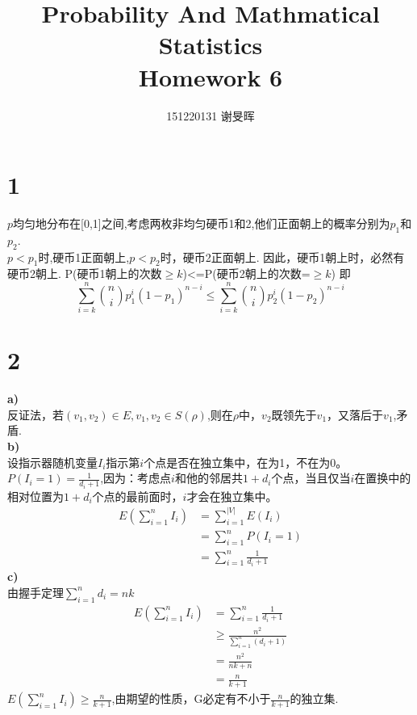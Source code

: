 \documentclass[a4paper,twocolumn]{ctexart}
\title{Probability And Mathmatical Statistics\\Homework 6}
\author{151220131 谢旻晖}
\date{}
\begin{document}
\maketitle
\section*{1}
$p$均匀地分布在[0,1]之间,考虑两枚非均匀硬币1和2,他们正面朝上的概率分别为$p_1$和$p_2$.\\
$p<p_1$时,硬币1正面朝上,$p<p_2$时，硬币2正面朝上.
因此，硬币1朝上时，必然有硬币2朝上.
P(硬币1朝上的次数$\ge k$)<=P(硬币2朝上的次数=$\ge k$)
即
\[
\sum_{i=k}^n\binom{n}{i}p_1^{i}(1-p_1)^{n-i}\le\sum_{i=k}^n\binom{n}{i}p_2^{i}(1-p_2)^{n-i}
\]
\section*{2}
\noindent \textbf{a)}\\
反证法，若$(v_1,v_2)\in E,v_1,v_2\in S(\rho)$,则在$\rho$中，$v_2$既领先于$v_1$，又落后于$v_1$,矛盾.\\
\noindent \textbf{b)}\\
设指示器随机变量$I_i$指示第$i$个点是否在独立集中，在为1，不在为0。$P(I_i=1)=\frac{1}{d_i+1}$,因为：考虑点$i$和他的邻居共$1+d_i$个点，当且仅当$i$在置换中的相对位置为$1+d_i$个点的最前面时，$i$才会在独立集中。
\begin{align*}
E(\sum_{i=1}^{n}I_i)&=\sum_{i=1}^{|V|}E(I_i)\\
&=\sum_{i=1}^{n}P(I_i=1)\\
&=\sum_{i=1}^{n}\frac{1}{d_i+1}
\end{align*}
\noindent \textbf{c)}\\
由握手定理$\sum_{i=1}^{n}d_i=nk$
\begin{align*}
E(\sum_{i=1}^{n}I_i)&=\sum_{i=1}^{n}\frac{1}{d_i+1}\\
&\ge \frac{n^2}{\sum_{i=1}^{n}(d_i+1)}\\
&=\frac{n^2}{nk+n}\\
&=\frac{n}{k+1}
\end{align*}
$E(\sum_{i=1}^{n}I_i)\ge \frac{n}{k+1}$,由期望的性质，G必定有不小于$\frac{n}{k+1}$的独立集.
\end{document}
